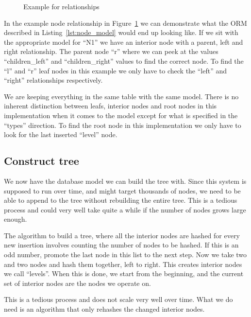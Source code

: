 \documentclass[../Main/thesis.tex]{subfiles}
\begin{document}
\begin{figure}[htpb]
\centering
{}
\caption{Example for relationships}
\label{fig:relationship_example}
\end{figure}

In the example node relationship in Figure~\ref{fig:relationship_example} we can
demonstrate what the ORM described in Listing~\ref{lst:node_model} would end up
looking like. If we sit with the appropriate model for ``N1'' we have an
interior node with a parent, left and right relationship. The parent node ``r''
where we can peek at the values ``children\_left'' and ``children\_right''
values to find the correct node. To find the ``l'' and ``r'' leaf nodes in this
example we only have to check the ``left'' and ``right'' relationships
respectively.

We are keeping everything in the same table with the same model. There is no
inherent distinction between leafs, interior nodes and root nodes in this
implementation when it comes to the model except for what is specified in the
``types'' direction. To find the root node in this implementation we only have
to look for the last inserted ``level'' node.

\subsection*{Construct tree}%
\label{sub:construct_tree}
We now have the database model we can build the tree with. Since this system is
supposed to run over time, and might target thousands of nodes, we need to be
able to append to the tree without rebuilding the entire tree. This is a
tedious process and could very well take quite a while if the number of nodes
grows large enough.

The algorithm to build a tree, where all the interior nodes are hashed for every
new insertion involves counting the number of nodes to be hashed. If this is an
odd number, promote the last node in this list to the next step. Now we take two
and two nodes and hash them together, left to right. This creates interior nodes
we call ``levels''. When this is done, we start from the beginning, and the
current set of interior nodes are the nodes we operate on.

This is a tedious process and does not scale very well over time. What we do
need is an algorithm that only rehashes the changed interior nodes.
\end{document}
